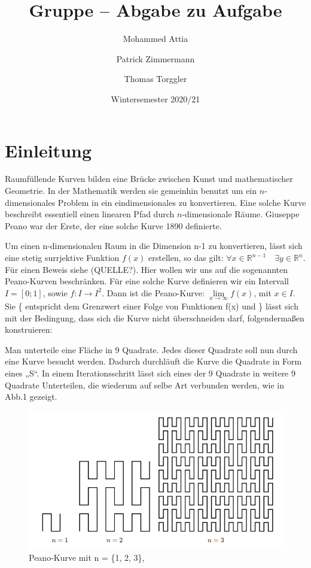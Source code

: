 \documentclass[course=asp]{aspdoc}
\author{Mohammed Attia \and Patrick Zimmermann \and Thomas Torggler}
\date{Wintersemester 2020/21} %
\title{Gruppe \theGroup{} -- Abgabe zu Aufgabe \theNumber}
\begin{document}
\maketitle

\newpage
\section{Einleitung}

Raumf\"ullende Kurven bilden eine Br\"ucke zwischen Kunst und mathematischer Geometrie. In der Mathematik werden sie gemeinhin benutzt um ein $n$-dimensionales Problem in ein eindimensionales zu konvertieren. Eine solche Kurve beschreibt essentiell einen linearen Pfad durch $n$-dimensionale R\"aume. Giuseppe Peano war der Erste, der eine solche Kurve 1890 definierte.

Um einen n-dimensionalen Raum in die Dimension n-1 zu konvertieren, l\"asst sich eine stetig surrjektive Funktion $f(x)$ erstellen, so das gilt: $\forall x \in \mathbb{R}^{n-1} \quad \exists y \in \mathbb{R}^n$. F\"ur einen Beweis siehe (QUELLE?). Hier wollen wir uns auf die sogenannten Peano-Kurven beschr\"anken. F\"ur eine solche Kurve definieren wir ein Intervall $I = [0;1]$, sowie  $f: I \rightarrow I^2 $. Dann ist die Peano-Kurve: $\lim\limits_{x \to \infty}f(x)$, mit $x \in I$. Sie \{ entspricht dem Grenzwert einer Folge von Funktionen f(x) und \} l\"asst sich mit der Bedingung, dass sich die Kurve nicht \"uberschneiden darf, folgendermaßen konstruieren:

Man unterteile eine Fl\"ache in 9 Quadrate. Jedes dieser Quadrate soll nun durch eine Kurve besucht werden. Dadurch durchl\"auft die Kurve die Quadrate in Form eines „S“.
In einem Iterationsschritt l\"asst sich eines der 9 Quadrate in weitere 9 Quadrate Unterteilen, die wiederum auf selbe Art verbunden werden, wie in Abb.1 gezeigt.

\begin{figure} [ht] %
\centering
\includegraphics{PeanoBsp.png}
\caption{Peano-Kurve mit n = \{1, 2, 3\}, ~\cite{aufgabenstellung}}\label{Abb:Peano}	
\end{figure}
\end{document}
